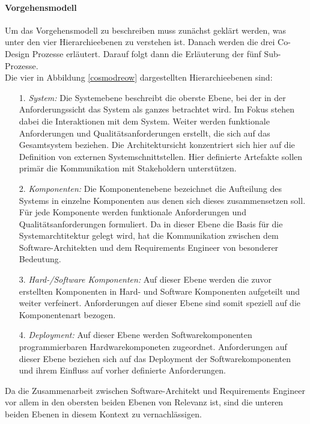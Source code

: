 \paragraph{Vorgehensmodell}
Um das Vorgehensmodell zu beschreiben muss zun\"achst gekl\"art werden, was unter den vier Hierarchieebenen zu verstehen ist. Danach werden die drei Co-Design Prozesse erl\"autert. Darauf folgt dann die Erl\"auterung der f\"unf Sub-Prozesse.\\

Die vier in Abbildung \ref{cosmodreow} dargestellten Hierarchieebenen sind:\\

\begin{itemize}
\item[1.] \emph{System:} Die Systemebene beschreibt die oberste Ebene, bei der in der Anforderungssicht das System als ganzes betrachtet wird. Im Fokus stehen dabei die Interaktionen mit dem System. Weiter werden funktionale Anforderungen und Qualit\"atsanforderungen erstellt, die sich auf das Gesamtsystem beziehen. Die Architektursicht konzentriert sich hier auf die Definition von externen Systemschnittstellen. Hier definierte Artefakte sollen prim\"ar die Kommunikation mit Stakeholdern unterst\"utzen.
\item[2.] \emph{Komponenten:} Die Komponentenebene bezeichnet die Aufteilung des Systems in einzelne Komponenten aus denen sich dieses zusammensetzen soll. F\"ur jede Komponente werden funktionale Anforderungen und Qualit\"atsanforderungen formuliert. Da in dieser Ebene die Basis f\"ur die Systemarchtitektur gelegt wird, hat die Kommunikation zwischen dem Software-Architekten und dem Requirements Engineer von besonderer Bedeutung. 
\item[3.] \emph{Hard-/Software Komponenten:} Auf dieser Ebene werden die zuvor erstellten Komponenten in Hard- und Software Komponenten aufgeteilt und weiter verfeinert. Anforderungen auf dieser Ebene sind somit speziell auf die Komponentenart bezogen. 
\item[4.] \emph{Deployment:} Auf dieser Ebene werden Softwarekomponenten programmierbaren Hardwarekomponeten zugeordnet. Anforderungen auf dieser Ebene beziehen sich auf das Deployment der Softwarekomponenten und ihrem Einfluss auf vorher definierte Anforderungen. \\
\end{itemize}
Da die Zusammenarbeit zwischen Software-Architekt und Requirements Engineer vor allem in den obersten beiden Ebenen von Relevanz ist, sind die unteren beiden Ebenen in diesem Kontext zu vernachl\"assigen.\\

